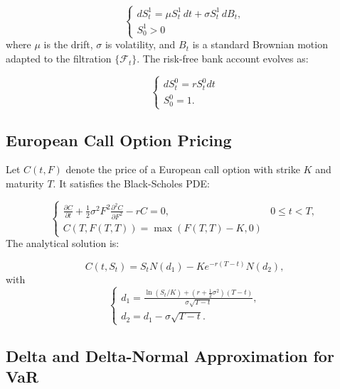 \documentclass[11pt,a4paper]{article}
\begin{document}
\begin{equation*}
\left\{
\begin{array}{l}
dS_t^1 =\mu S_t^1 \, dt + \sigma S_t^1 \, dB_t, \\[1mm]
S_0^1 > 0
\end{array}
\right.
\end{equation*}
where $\mu$ is the drift, $\sigma$ is volatility, and $B_t$ is a standard Brownian motion adapted to the filtration $\{\mathcal{F}_t\}$. The risk-free bank account evolves as:

\begin{equation*}
\left\{
\begin{array}{l}
dS_t^0 = r S_t^0 dt \\[1mm]
S_0^0=1.
\end{array}
\right.
\end{equation*}

\subsection{European Call Option Pricing}
Let $C(t,F)$ denote the price of a European call option with strike $K$ and maturity $T$. It satisfies the Black-Scholes PDE:

\begin{equation*}
\begin{cases}
\displaystyle \frac{\partial C}{\partial t} + \frac{1}{2} \sigma^2 F^2 \frac{\partial^2 C}{\partial F^2} - r C = 0, & 0 \le t < T, \\[3mm]
C(T, F(T,T)) = \max(F(T,T) - K, 0)
\end{cases}
\end{equation*}
The analytical solution is:

\begin{equation*}
C(t,S_t) = S_t N(d_1) - K e^{-r(T-t)} N(d_2),
\end{equation*}
with
\begin{equation*}
\begin{cases}
d_1 = \displaystyle \frac{\ln(S_t/K) + \left(r + \frac{1}{2}\sigma^2\right)(T-t)}{\sigma \sqrt{T-t}},\\[2mm]
d_2 = d_1 - \sigma \sqrt{T-t}.
\end{cases}
\end{equation*}


\subsection{Delta and Delta-Normal Approximation for VaR}
\end{document}
